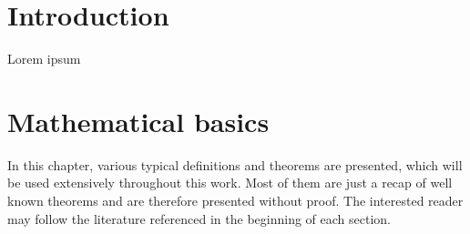 \documentclass[12pt,a4paper,twoside, open=right]{scrreprt}
\theoremstyle{definition}
\theoremstyle{plain}
\begin{document}
\chapter{Introduction}
Lorem ipsum
\newpage
\chapter{Mathematical basics}
In this chapter, various typical definitions and theorems are presented, which will be used extensively throughout this work. Most of them are just a recap of well known theorems and are therefore presented without proof. The interested reader may follow the literature referenced in the beginning of each section.
\end{document}
